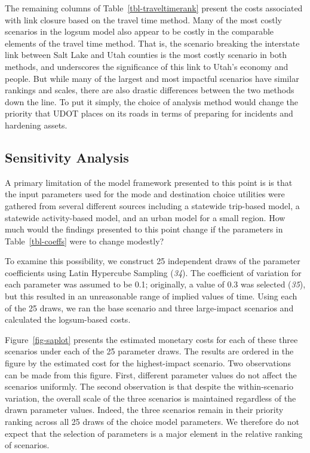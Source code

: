 \documentclass[
  letterpaper,
]{trb}
\begin{document}
The remaining columns of Table~\ref{tbl-traveltimerank} present the
costs associated with link closure based on the travel time method. Many
of the most costly scenarios in the logsum model also appear to be
costly in the comparable elements of the travel time method. That is,
the scenario breaking the interstate link between Salt Lake and Utah
counties is the most costly scenario in both methods, and underscores
the significance of this link to Utah's economy and people. But while
many of the largest and most impactful scenarios have similar rankings
and scales, there are also drastic differences between the two methods
down the line. To put it simply, the choice of analysis method would
change the priority that UDOT places on its roads in terms of preparing
for incidents and hardening assets.

\hypertarget{sensitivity-analysis}{%
\subsection{Sensitivity Analysis}\label{sensitivity-analysis}}

A primary limitation of the model framework presented to this point is
is that the input parameters used for the mode and destination choice
utilities were gathered from several different sources including a
statewide trip-based model, a statewide activity-based model, and an
urban model for a small region. How much would the findings presented to
this point change if the parameters in Table~\ref{tbl-coeffs} were to
change modestly?

To examine this possibility, we construct 25 independent draws of the
parameter coefficients using Latin Hypercube Sampling (\emph{34}). The
coefficient of variation for each parameter was assumed to be 0.1;
originally, a value of 0.3 was selected (\emph{35}), but this resulted
in an unreasonable range of implied values of time. Using each of the 25
draws, we ran the base scenario and three large-impact scenarios and
calculated the logsum-based costs.

Figure~\ref{fig-saplot} presents the estimated monetary costs for each
of these three scenarios under each of the 25 parameter draws. The
results are ordered in the figure by the estimated cost for the
highest-impact scenario. Two observations can be made from this figure.
First, different parameter values do not affect the scenarios uniformly.
The second observation is that despite the within-scenario variation,
the overall scale of the three scenarios is maintained regardless of the
drawn parameter values. Indeed, the three scenarios remain in their
priority ranking across all 25 draws of the choice model parameters. We
therefore do not expect that the selection of parameters is a major
element in the relative ranking of scenarios.
\end{document}
